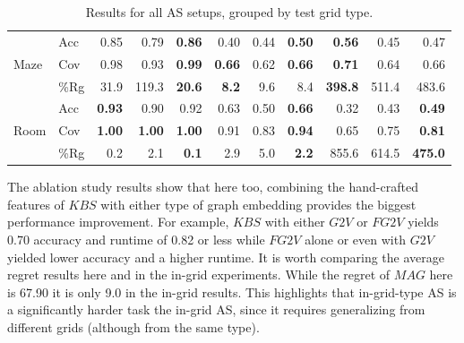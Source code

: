 \documentclass[letterpaper]{article} %
\newcommand{\gtv}[1]{\ensuremath{\textit{G2V}}\xspace}
\newcommand{\fgtv}[1]{\ensuremath{\textit{FG2V}}\xspace}
\newcommand{\kaduri}[1]{\ensuremath{\textit{KBS}}\xspace}
\newcommand{\mapfgas}[1]{\ensuremath{\textit{MAG}}\xspace}
\begin{document}
\begin{table}[bthp]
\begin{tabular}{@{}ll|rrr|rrr|rrr@{}}
\midrule
\multirow{3}{*}{Maze}      & Acc      & 0.85                    & 0.79                    & \textbf{0.86}           & 0.40                    & 0.44                    & \textbf{0.50}           & \textbf{0.56}           & 0.45                    & 0.47                    \\
                           & Cov      & 0.98                    & 0.93                    & \textbf{0.99}           & \textbf{0.66}           & 0.62                    & \textbf{0.66}           & \textbf{0.71}           & 0.64                    & 0.66                    \\
                           & \%Rg     & 31.9                    & 119.3                   & \textbf{20.6}           & \textbf{8.2}            & 9.6                     & 8.4                     & \textbf{398.8}          & 511.4                   & 483.6                   \\
\midrule
\multirow{3}{*}{Room}      & Acc      & \textbf{0.93}           & 0.90                    & 0.92                    & 0.63                    & 0.50                    & \textbf{0.66}           & 0.32                    & 0.43                    & \textbf{0.49}           \\
                           & Cov      & \textbf{1.00}           & \textbf{1.00}           & \textbf{1.00}           & 0.91                    & 0.83                    & \textbf{0.94}           & 0.65                    & 0.75                    & \textbf{0.81}           \\
                           & \%Rg     & 0.2                     & 2.1                     & \textbf{0.1}            & 2.9                     & 5.0                     & \textbf{2.2}            & 855.6                   & 614.5                   & \textbf{475.0}          \\ \bottomrule 
\end{tabular}
\caption{Results for all AS setups, grouped by test grid type.}
\label{tab:by-grid-type}
\end{table}


The ablation study results show that here too, combining the hand-crafted features of \kaduri\ with either type of graph embedding provides the biggest performance improvement. For example, \kaduri\ with either \gtv\ or \fgtv\ yields 0.70 accuracy and runtime of 0.82 or less while \fgtv\ alone or even with \gtv\ yielded lower accuracy and a higher runtime. It is worth comparing the average regret results here and in the in-grid experiments. While the regret of \mapfgas\ here is 67.90 it is only 9.0 in the in-grid results. This highlights that in-grid-type AS is a significantly harder task the in-grid AS, since it requires generalizing from different grids (although from the same type). 
\end{document}
